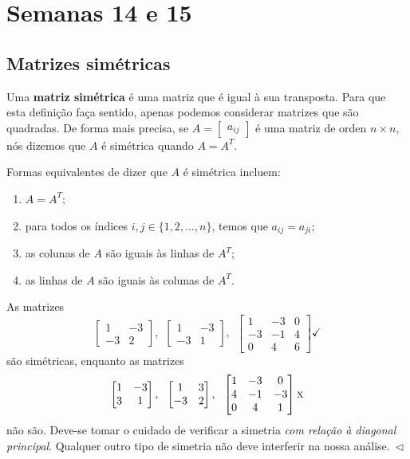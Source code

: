 \documentclass[../livro.tex]{subfiles}
\begin{document}
\chapter{Semanas 14 e 15}

\section{Matrizes simétricas}

Uma \textbf{matriz simétrica} é uma matriz que é igual à sua transposta. Para que esta definição faça sentido, apenas podemos considerar matrizes que são quadradas. De forma mais precisa, se $A = \begin{bmatrix} a_{ij} \end{bmatrix}$ é uma matriz de orden $n \times n$, nós dizemos que $A$ é simétrica quando $A = A^T$.

Formas equivalentes de dizer que $A$ é simétrica incluem:
\begin{enumerate}[$(1)$]
	\item $A = A^T$;
	\item para todos os índices $i,j \in \{1,2,\dots,n\}$, temos que $a_{ij} = a_{ji}$;
	\item as colunas de $A$ são iguais às linhas de $A^T$;
	\item as linhas de $A$ são iguais às colunas de $A^T$.
\end{enumerate}

\begin{example}
	As matrizes
	\begin{equation}
	\begin{bmatrix}
	1 & -3 \\
	-3 &  2
	\end{bmatrix}, \ \ 
	\begin{bmatrix}
	1 & -3 \\
	-3 &  1
	\end{bmatrix}, \ \ 
	\begin{bmatrix}
	1 & -3 & 0 \\
	-3 & -1 & 4 \\
	0 &  4 & 6
	\end{bmatrix} \checkmark
	\end{equation} são simétricas, enquanto  as matrizes
	\begin{equation}
	\begin{bmatrix}
	1 & -3 \\
	3 &  1
	\end{bmatrix},\ \ 
	\begin{bmatrix}
	1 &  3 \\
	-3 &  2
	\end{bmatrix},\ \ 
	\begin{bmatrix}
	1 & -3 &  0 \\
	4 & -1 & -3 \\
	0 &  4 &  1
	\end{bmatrix} \textsc{x}
	\end{equation} não são. Deve-se tomar o cuidado de verificar a simetria \textit{com relação à diagonal principal}. Qualquer outro tipo de simetria não deve interferir na nossa análise$. \ \lhd$
\end{example}
\end{document}
